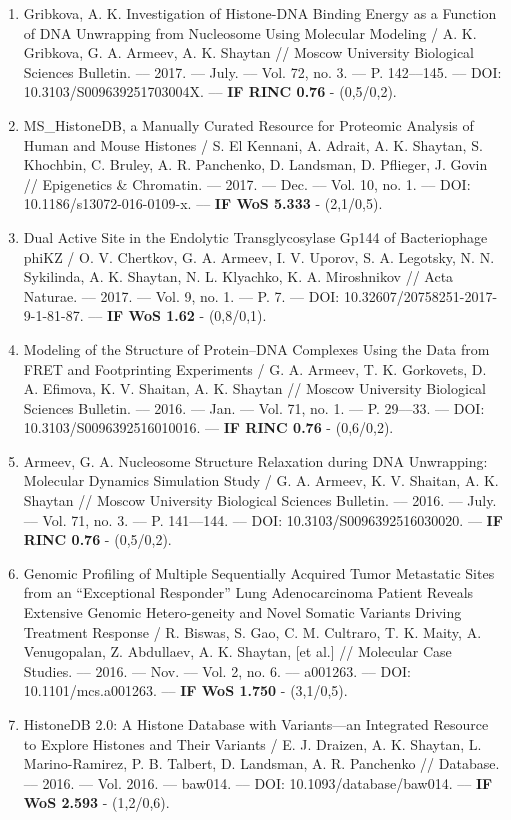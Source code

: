 \begin{frame}[allowframebreaks]
\begin{enumerate}
\item  Gribkova, A. K. Investigation of Histone-DNA Binding Energy as a Function of DNA Unwrapping from Nucleosome Using Molecular Modeling / A. K. Gribkova, G. A. Armeev, A. K. Shaytan // Moscow University Biological Sciences Bulletin. –– 2017. –– July. –– Vol. 72, no. 3. –– P. 142––145. –– DOI: 10.3103/S009639251703004X. –– \textbf{IF RINC 0.76} - (0,5/0,2).
\item  MS\_HistoneDB, a Manually Curated Resource for Proteomic Analysis of Human and Mouse Histones / S. El Kennani, A. Adrait, A. K. Shaytan, S. Khochbin, C. Bruley, A. R. Panchenko, D. Landsman, D. Pflieger, J. Govin // Epigenetics \& Chromatin. –– 2017. –– Dec. –– Vol. 10, no. 1. –– DOI: 10.1186/s13072-016-0109-x. –– \textbf{IF WoS 5.333} - (2,1/0,5).
\item  Dual Active Site in the Endolytic Transglycosylase Gp144 of Bacteriophage phiKZ / O. V. Chertkov, G. A. Armeev, I. V. Uporov, S. A. Legotsky, N. N. Sykilinda, A. K. Shaytan, N. L. Klyachko, K. A. Miroshnikov // Acta Naturae. –– 2017. –– Vol. 9, no. 1. –– P. 7. –– DOI: 10.32607/20758251-2017-9-1-81-87. –– \textbf{IF WoS 1.62} - (0,8/0,1).
\item  Modeling of the Structure of Protein–DNA Complexes Using the Data from FRET and Footprinting Experiments / G. A. Armeev, T. K. Gorkovets, D. A. Efimova, K. V. Shaitan, A. K. Shaytan // Moscow University Biological Sciences Bulletin. –– 2016. –– Jan. –– Vol. 71, no. 1. –– P. 29––33. –– DOI: 10.3103/S0096392516010016. –– \textbf{IF RINC 0.76} - (0,6/0,2).
\item  Armeev, G. A. Nucleosome Structure Relaxation during DNA Unwrapping: Molecular Dynamics Simulation Study / G. A. Armeev, K. V. Shaitan, A. K. Shaytan // Moscow University Biological Sciences Bulletin. –– 2016. –– July. –– Vol. 71, no. 3. –– P. 141––144. –– DOI: 10.3103/S0096392516030020. –– \textbf{IF RINC 0.76} - (0,5/0,2).
 \item  Genomic Profiling of Multiple Sequentially Acquired Tumor Metastatic Sites from an “Exceptional Responder” Lung Adenocarcinoma Patient Reveals Extensive Genomic Hetero-geneity and Novel Somatic Variants Driving Treatment Response / R. Biswas, S. Gao, C. M. Cultraro, T. K. Maity, A. Venugopalan, Z. Abdullaev, A. K. Shaytan, [et al.] // Molecular Case Studies. –– 2016. –– Nov. –– Vol. 2, no. 6. –– a001263. –– DOI: 10.1101/mcs.a001263. –– \textbf{IF WoS 1.750} - (3,1/0,5).
 \item  HistoneDB 2.0: A Histone Database with Variants—an Integrated Resource to Explore Histones and Their Variants / E. J. Draizen, A. K. Shaytan, L. Marino-Ramirez, P. B. Talbert, D. Landsman, A. R. Panchenko // Database. –– 2016. –– Vol. 2016. –– baw014. –– DOI: 10.1093/database/baw014. –– \textbf{IF WoS 2.593} - (1,2/0,6).

\end{enumerate}
\end{frame}
